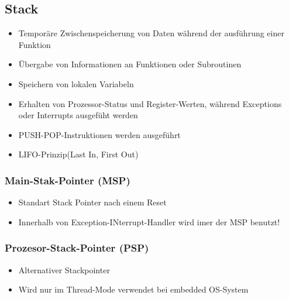 \subsection{Stack}
\begin{multicols}{2}
\begin{minipage}{0.5\textwidth}
    \begin{itemize}
        \item Temporäre Zwischenspeicherung von Daten während der ausführung einer Funktion
        \item Übergabe von Informationen an Funktionen oder Subroutinen
        \item Speichern von lokalen Variabeln
        \item Erhalten von Prozessor-Status und Register-Werten, während Exceptions oder Interrupts ausgefüht werden
        \item PUSH-POP-Instruktionen werden ausgeführt
        \item LIFO-Prinzip(Last In, First Out)
    \end{itemize}
\end{minipage}

\begin{minipage}{0.5\textwidth}
    \subsubsection{Main-Stak-Pointer (MSP)}
    \begin{itemize}
        \item Standart Stack Pointer nach einem Reset
        \item Innerhalb von Exception-INterrupt-Handler wird imer der MSP benutzt!
        \end{itemize}
    \subsubsection{Prozesor-Stack-Pointer (PSP)}
    \begin{itemize}
        \item Alternativer Stackpointer
        \item Wird nur im Thread-Mode verwendet
        \subitem \rightarrow bei embedded OS-System
    \end{itemize}   
\end{minipage}
\end{multicols}

















